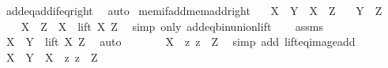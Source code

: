 \begin{isabellebody}
\ add{\isacharunderscore}{\kern0pt}eq{\isacharunderscore}{\kern0pt}add{\isacharunderscore}{\kern0pt}if{\isacharunderscore}{\kern0pt}eq{\isacharunderscore}{\kern0pt}right\ \isamarkupfalse%
\ auto%
\endisatagproof
{\isafoldproof}%
%
\isadelimproof
\isanewline
%
\endisadelimproof
\isanewline
{}\isamarkupfalse%
\ mem{\isacharunderscore}{\kern0pt}if{\isacharunderscore}{\kern0pt}add{\isacharunderscore}{\kern0pt}mem{\isacharunderscore}{\kern0pt}add{\isacharunderscore}{\kern0pt}right{\isacharcolon}{\kern0pt}\isanewline
\ \ \ {\isachardoublequoteopen}X\ {\isacharplus}{\kern0pt}\ Y\ {\isasymin}\ X\ {\isacharplus}{\kern0pt}\ Z{\isachardoublequoteclose}\isanewline
\ \ \ {\isachardoublequoteopen}Y\ {\isasymin}\ Z{\isachardoublequoteclose}\isanewline
%
\isadelimproof
%
\endisadelimproof
%
\isatagproof
{}\isamarkupfalse%
\ {\isacharminus}{\kern0pt}\isanewline
\ \ \isamarkupfalse%
\ {\isachardoublequoteopen}X\ {\isacharplus}{\kern0pt}\ Z\ {\isacharequal}{\kern0pt}\ X\ {\isasymunion}\ lift\ X\ Z{\isachardoublequoteclose}\ \isamarkupfalse%
\ {\isacharparenleft}{\kern0pt}simp\ only{\isacharcolon}{\kern0pt}\ add{\isacharunderscore}{\kern0pt}eq{\isacharunderscore}{\kern0pt}bin{\isacharunderscore}{\kern0pt}union{\isacharunderscore}{\kern0pt}lift{\isacharparenright}{\kern0pt}\isanewline
\ \ \isamarkupfalse%
\ assms\ \isamarkupfalse%
\ {\isachardoublequoteopen}X\ {\isacharplus}{\kern0pt}\ Y\ {\isasymin}\ lift\ X\ Z{\isachardoublequoteclose}\ \isamarkupfalse%
\ auto\isanewline
\ \ \isamarkupfalse%
\ \isamarkupfalse%
\ {\isachardoublequoteopen}{\isachardot}{\kern0pt}{\isachardot}{\kern0pt}{\isachardot}{\kern0pt}\ {\isacharequal}{\kern0pt}\ {\isacharbraceleft}{\kern0pt}X\ {\isacharplus}{\kern0pt}\ z{\isacharbar}{\kern0pt}\ z\ {\isasymin}\ Z{\isacharbraceright}{\kern0pt}{\isachardoublequoteclose}\ \isamarkupfalse%
\ {\isacharparenleft}{\kern0pt}simp\ add{\isacharcolon}{\kern0pt}\ lift{\isacharunderscore}{\kern0pt}eq{\isacharunderscore}{\kern0pt}image{\isacharunderscore}{\kern0pt}add{\isacharparenright}{\kern0pt}\isanewline
\ \ \isamarkupfalse%
\ \isamarkupfalse%
\ {\isachardoublequoteopen}X\ {\isacharplus}{\kern0pt}\ Y\ {\isasymin}\ {\isacharbraceleft}{\kern0pt}X\ {\isacharplus}{\kern0pt}\ z{\isacharbar}{\kern0pt}\ z\ {\isasymin}\ Z{\isacharbraceright}{\kern0pt}{\isachardoublequoteclose}\ \isacommand{{\isachardot}{\kern0pt}}\isamarkupfalse%

\end{isabellebody}
